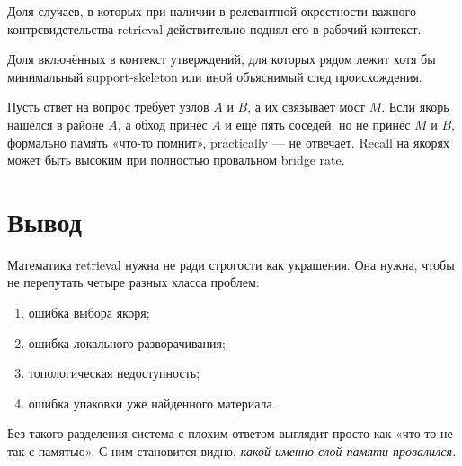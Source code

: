 \begin{definition}
Доля случаев, в которых при наличии в релевантной окрестности важного контрсвидетельства
retrieval действительно поднял его в рабочий контекст.
\end{definition}

\begin{definition}
Доля включённых в контекст утверждений, для которых рядом лежит хотя бы минимальный
support-skeleton или иной объяснимый след происхождения.
\end{definition}

\begin{workedbox}
Пусть ответ на вопрос требует узлов $A$ и $B$, а их связывает мост $M$. Если якорь
нашёлся в районе $A$, а обход принёс $A$ и ещё пять соседей, но не принёс $M$ и $B$,
формально память «что-то помнит», practically — не отвечает. Recall на якорях может
быть высоким при полностью провальном bridge rate.
\end{workedbox}

\section{Вывод}

Математика retrieval нужна не ради строгости как украшения. Она нужна, чтобы не
перепутать четыре разных класса проблем:
\begin{enumerate}
\item ошибка выбора якоря;
\item ошибка локального разворачивания;
\item топологическая недоступность;
\item ошибка упаковки уже найденного материала.
\end{enumerate}

Без такого разделения система с плохим ответом выглядит просто как «что-то не так с
памятью». С ним становится видно, \emph{какой именно слой памяти провалился}.
